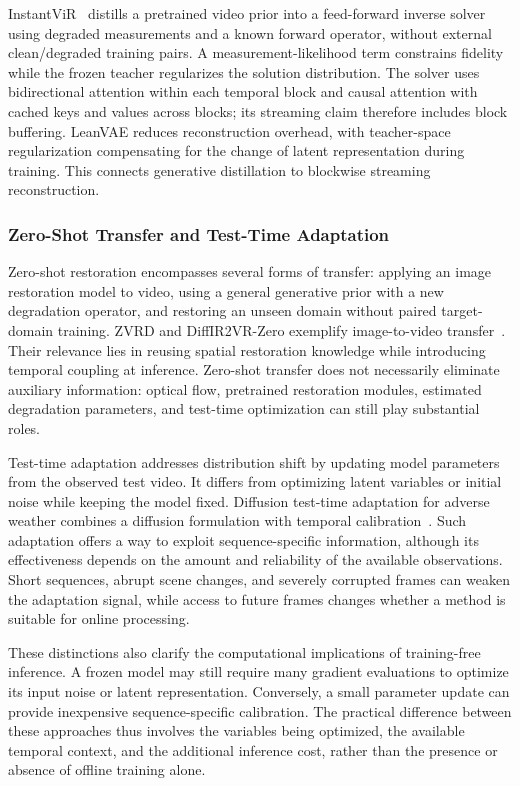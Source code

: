 InstantViR~\cite{instantvir} distills a pretrained video prior into a feed-forward inverse solver using degraded measurements and a known forward operator, without external clean/degraded training pairs. A measurement-likelihood term constrains fidelity while the frozen teacher regularizes the solution distribution. The solver uses bidirectional attention within each temporal block and causal attention with cached keys and values across blocks; its streaming claim therefore includes block buffering. LeanVAE reduces reconstruction overhead, with teacher-space regularization compensating for the change of latent representation during training. This connects generative distillation to blockwise streaming reconstruction.

\subsubsection{Zero-Shot Transfer and Test-Time Adaptation}
Zero-shot restoration encompasses several forms of transfer: applying an image restoration model to video, using a general generative prior with a new degradation operator, and restoring an unseen domain without paired target-domain training. ZVRD and DiffIR2VR-Zero exemplify image-to-video transfer~\cite{zvrd,diffir2vr}. Their relevance lies in reusing spatial restoration knowledge while introducing temporal coupling at inference. Zero-shot transfer does not necessarily eliminate auxiliary information: optical flow, pretrained restoration modules, estimated degradation parameters, and test-time optimization can still play substantial roles.

Test-time adaptation addresses distribution shift by updating model parameters from the observed test video. It differs from optimizing latent variables or initial noise while keeping the model fixed. Diffusion test-time adaptation for adverse weather combines a diffusion formulation with temporal calibration~\cite{difftta}. Such adaptation offers a way to exploit sequence-specific information, although its effectiveness depends on the amount and reliability of the available observations. Short sequences, abrupt scene changes, and severely corrupted frames can weaken the adaptation signal, while access to future frames changes whether a method is suitable for online processing.

These distinctions also clarify the computational implications of training-free inference. A frozen model may still require many gradient evaluations to optimize its input noise or latent representation. Conversely, a small parameter update can provide inexpensive sequence-specific calibration. The practical difference between these approaches thus involves the variables being optimized, the available temporal context, and the additional inference cost, rather than the presence or absence of offline training alone.

